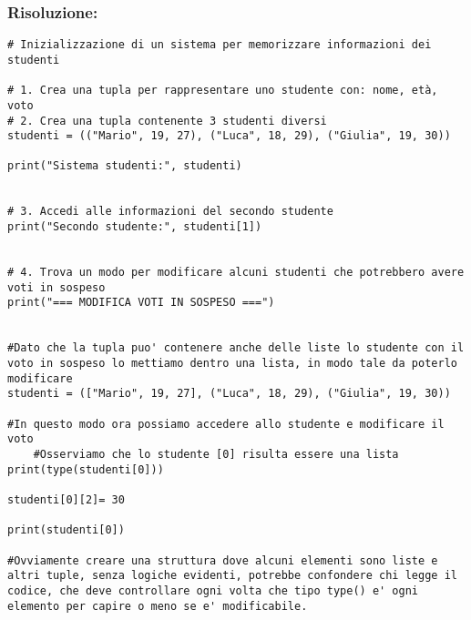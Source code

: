 \subsubsection{Risoluzione: }

\begin{lstlisting}
# Inizializzazione di un sistema per memorizzare informazioni dei studenti

# 1. Crea una tupla per rappresentare uno studente con: nome, età, voto 
# 2. Crea una tupla contenente 3 studenti diversi 
studenti = (("Mario", 19, 27), ("Luca", 18, 29), ("Giulia", 19, 30))

print("Sistema studenti:", studenti)


# 3. Accedi alle informazioni del secondo studente 
print("Secondo studente:", studenti[1])


# 4. Trova un modo per modificare alcuni studenti che potrebbero avere voti in sospeso
print("=== MODIFICA VOTI IN SOSPESO ===")


#Dato che la tupla puo' contenere anche delle liste lo studente con il voto in sospeso lo mettiamo dentro una lista, in modo tale da poterlo modificare
studenti = (["Mario", 19, 27], ("Luca", 18, 29), ("Giulia", 19, 30))

#In questo modo ora possiamo accedere allo studente e modificare il voto
    #Osserviamo che lo studente [0] risulta essere una lista
print(type(studenti[0]))

studenti[0][2]= 30

print(studenti[0])

#Ovviamente creare una struttura dove alcuni elementi sono liste e altri tuple, senza logiche evidenti, potrebbe confondere chi legge il codice, che deve controllare ogni volta che tipo type() e' ogni elemento per capire o meno se e' modificabile.
\end{lstlisting}

\newpage






